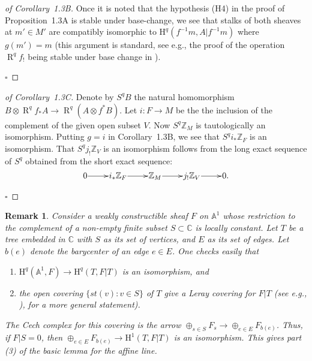 \documentclass[10pt,twoside]{article}
\newcommand{\Z}{{\mathbb {Z}}}
\newcommand{\homology}{{\mathrm {H}}}
\newcommand{\C}{{\mathbb {C}}}
\newcommand{\A}{{\mathbb {A}}}
\newcommand{\derived}{{\operatorname{R}}}
\newcommand{\qed}{\nopagebreak\par\hspace*{\fill}$\square$\par\vskip2mm}
\newtheorem{proof}{Proof}
\newtheorem{remark}[thm]{Remark}
\begin{document}
\begin{proof}[of Corollary~1.3B] Once it is noted that the hypothesis
(H4) in the proof of Proposition~1.3A is stable under base-change,
we see that stalks of both sheaves at $m'\! \in\! M'$ are compatibly 
isomorphic to $\homology^q(f^{-1}m, A|f^{-1}m)$ where $g(m')=m$
(this argument is standard, see e.g., 
the proof of the operation $\derived^qf_!$  being stable
under base change in \cite[page~49]{nori:SGAfourhalf}).  
\qed\end{proof}

\begin{proof}[of Corollary~1.3C] Denote by $S^qB$ the natural
 homomorphism $B \otimes \derived ^qf_*A \to 
\derived ^q (A \otimes f^*B)$.  
 Let $i:F \to M$ be the the inclusion
of the complement of the given open subset $V$. Now $S^q\Z_M$
is tautologically an isomorphism. Putting $g=i$ in Corollary~1.3B,
we see that $S^qi_*\Z_F$ is an
isomorphism. That $S^qj_!\Z_V$ is an isomorphism follows from
the long exact sequence of $S^q$ obtained from 
the short exact sequence: 
$$
\xymatrix@1{0 \ar[r] & i_*\Z_F \ar[r] & \Z_M \ar[r] & j_!\Z_V
\ar[r] & 0.
}
$$
\qed\end{proof}

\setcounter{thm}{3}
\begin{remark}
Consider a weakly constructible
sheaf $F$ on $\A ^1$ whose restriction to the complement of a non-empty
finite subset $S\subset \C$ is locally constant. Let $T$ be a tree embedded in 
$\C$ with $S$ as its set of vertices, and $E$ as its
set of edges. Let $b(e)$ denote the barycenter
 of an edge $e \in E$.  One checks easily that
\begin{enumerate}
\item[(a)] $\homology^q(\A ^1,F)\to \homology^q(T,F|T)$ is an isomorphism,
and 
\item[(b)] the open covering $\{ st(v): v \in S\}$  
 of $T$
give a Leray covering for $F|T$ (see e.g., 
\cite[Chapter~VIII,~Prop.~8.1.4.(ii),~page~323]{nori:KS}), 
for a more general statement). 
\end{enumerate}
The Cech complex for this covering is the arrow  
$ \oplus_{s \in S}F_s \to \oplus_{e \in E}F_{b(e)}$. Thus,  
 if $F|S=0$, then $ \oplus_{e \in E}F_{b(e)} \to\homology^1(T,F|T)$
 is an isomorphism. This gives part (3) of the basic lemma for the affine line.
\end{remark}
\end{document}
